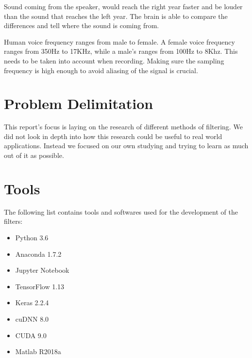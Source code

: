 Sound coming from the speaker, would reach  the right year faster and be louder than 
the sound that reaches the left year. The brain is able to compare the differences
and tell where the sound is coming from.

Human voice frequency ranges from male to female. A female voice frequency ranges from 
350Hz to 17KHz, while a male's ranges from 100Hz to 8Khz. This needs to be taken into
account when recording. Making sure the sampling frequency is high enough to avoid 
aliasing of the signal is crucial.\cite{VOICEFREQUENCY}
\newpage
\section{Problem Delimitation}
This report's focus is laying on the research of different methods of filtering. We did not
look in depth into how this research could be useful to real world applications. Instead we 
focused on our own studying and trying to learn as much out of it as possible.
\section{Tools}
The following list contains tools and softwares used for the development of the filters:
\begin{itemize}
\item Python 3.6
\item Anaconda 1.7.2
\item Jupyter Notebook
\item TensorFlow 1.13
\item Keras 2.2.4
\item cuDNN 8.0
\item CUDA 9.0
\item Matlab R2018a
\end{itemize}

